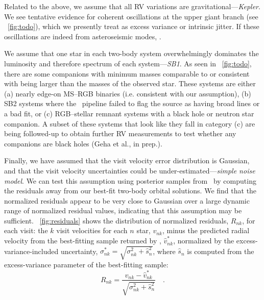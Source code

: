 \documentclass[modern, letterpaper]{aastex62}
\newcommand{\apogee}{\project{\acronym{APOGEE}}}
\newcommand{\thejoker}{\project{The~Joker}}
\begin{document}
Related to the above, we assume that all RV variations are
gravitational---\emph{Kepler}.
We see tentative evidence for coherent oscillations at the upper giant branch
(see \figurename~\ref{fig:todo}), which we presently treat as excess variance or
intrinsic jitter.
If these oscillations are indeed from asteroseismic modes, .

We assume that one star in each two-body system overwhelmingly dominates the
luminosity and therefore spectrum of each system---\emph{SB1}.
As seen in \figurename~\ref{fig:todo}, there are some companions with minimum
masses comparable to or consistent with being larger than the masses of the
observed star.
These systems are either (a) nearly edge-on MS--RGB binaries (i.e. consistent
with our assumption), (b) SB2 systems where the \apogee\ pipeline failed to flag
the source as having broad lines or a bad fit, or (c) RGB--stellar remnant
systems with a black hole or neutron star companion.
A subset of these systems that look like they fall in category (c) are being
followed-up to obtain further RV measurements to test whether any companions are
black holes (Geha et al., in prep.).

Finally, we have assumed that the visit velocity error distribution is Gaussian,
and that the visit velocity uncertainties could be
under-estimated---\emph{simple noise model}.
We can test this assumption using posterior samples from \thejoker\ by computing
the residuals away from our best-fit two-body orbital solutions.
We find that the normalized residuals appear to be very close to Gaussian over a
large dynamic range of normalized residual values, indicating that this
assumption may be sufficient.
\figurename~\ref{fig:residuals} shows the distribution of normalized residuals,
$R_{nk}$, for each visit: the $k$ visit velocities for each $n$ star, $v_{nk}$,
minus the predicted radial velocity from the best-fitting sample returned by
\thejoker, $\hat{v}^*_{nk}$, normalized by the excess-variance-included
uncertainty, $\sigma_{nk}^* = \sqrt{\sigma_{nk}^2 + \hat{s}_{n}^2}$, where
$\hat{s}_{n}$ is computed from the excess-variance parameter of the best-fitting
sample:
\begin{equation}
    R_{nk} = \frac{v_{nk} - \hat{v}^*_{nk}}{\sqrt{\sigma_{nk}^2 +
    \hat{s}_{n}^2}} \quad . \label{eq:normresid}
\end{equation}
\end{document}
